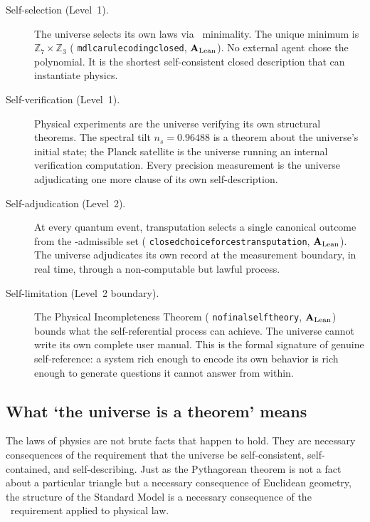 \documentclass[11pt,openany]{book}
\theoremstyle{remark}
\newcommand{\MDL}{\text{MDL}}
\newcommand{\PSC}{\text{PSC}}
\newcommand{\ZS}{\mathbb{Z}_7}
\newcommand{\lean}[1]{%
  \penalty-100
  \begingroup\def\_{\textunderscore\allowbreak}\texttt{#1}\endgroup}
\newcommand{\ns}{n_s}
\newcommand{\CatAL}{\ensuremath{\textbf{A}_{\rm Lean}}}
\begin{document}
\begin{description}
\item[Self-selection (Level~1).]  The universe selects its own laws via \MDL\ minimality.
  The unique minimum is $\ZS \times \mathbb{Z}_3$ (\lean{mdl\_ca\_rule\_coding\_closed},
  \CatAL). No external agent chose the polynomial. It is the shortest self-consistent
  closed description that can instantiate physics.

\item[Self-verification (Level~1).]  Physical experiments are the universe verifying
  its own structural theorems. The spectral tilt $\ns = 0.96488$ is a theorem about the
  universe's initial state; the Planck satellite is the universe running an internal
  verification computation. Every precision measurement is the universe adjudicating
  one more clause of its own self-description.

\item[Self-adjudication (Level~2).]  At every quantum event, transputation selects a
  single canonical outcome from the \PSC-admissible set
  (\lean{closed\_choice\_forces\_transputation}, \CatAL). The universe adjudicates its
  own record at the measurement boundary, in real time, through a non-computable but
  lawful process.

\item[Self-limitation (Level~2 boundary).]  The Physical Incompleteness Theorem
  (\lean{no\_final\_self\_theory}, \CatAL) bounds what the self-referential process
  can achieve. The universe cannot write its own complete user manual. This is the
  formal signature of genuine self-reference: a system rich enough to encode its own
  behavior is rich enough to generate questions it cannot answer from within.
\end{description}

\subsection*{What `the universe is a theorem' means}

The laws of physics are not brute facts that happen to hold. They are necessary
consequences of the requirement that the universe be self-consistent, self-contained,
and self-describing. Just as the Pythagorean theorem is not a fact about a particular
triangle but a necessary consequence of Euclidean geometry, the structure of the
Standard Model is a necessary consequence of the \PSC\ requirement applied to
physical law.
\end{document}
